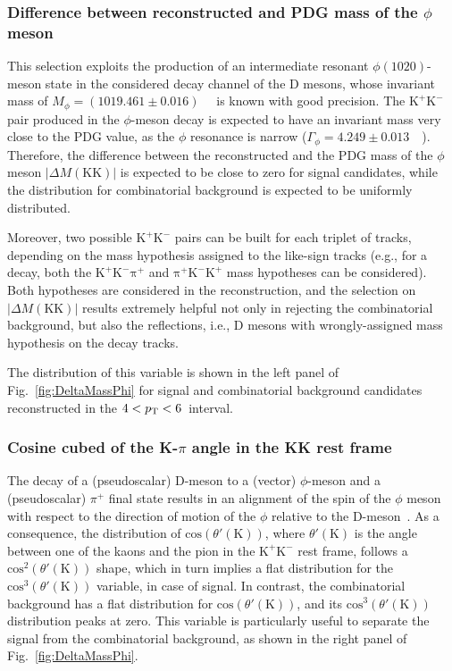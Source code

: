 \subsubsection{Difference between reconstructed and PDG mass of the \boldmath$\phi$ meson}
\begin{sloppypar}
This selection exploits the production of an intermediate resonant $\phi(1020)$-meson state in the considered decay channel of the D mesons, whose invariant mass of \mbox{$M_\phi = (1019.461\pm0.016)$}~\mevcc~\cite{pdg} is known with good precision. The $\mathrm{K^+K^-}$ pair produced in the $\phi$-meson decay is expected to have an invariant mass very close to the PDG value, as the $\phi$ resonance is narrow ($\Gamma_\phi = 4.249\pm0.013$~\mevcc~\cite{pdg}). Therefore, the difference between the reconstructed and the PDG mass of the $\phi$ meson $\lvert\Delta M(\mathrm{KK})\rvert$ is expected to be close to zero for signal candidates, while the distribution for combinatorial background is expected to be uniformly distributed.
\end{sloppypar}
Moreover, two possible $\mathrm{K^+K^-}$ pairs can be built for each triplet of tracks, depending on the mass hypothesis assigned to the like-sign tracks (e.g., for a \ds decay, both the $\mathrm{K^+K^-\pi^+}$ and $\mathrm{\pi^+K^-K^+}$ mass hypotheses can be considered). Both hypotheses are considered in the reconstruction, and the selection on $\lvert\Delta M(\mathrm{KK})\rvert$  results extremely helpful not only in rejecting the combinatorial background, but also the reflections, i.e., D mesons with wrongly-assigned mass hypothesis on the decay tracks.


The distribution of this variable is shown in the left panel of Fig.~\ref{fig:DeltaMassPhi} for signal and combinatorial background candidates reconstructed in the $4 < p_\mathrm{T} < 6$~\gevc interval.

\subsubsection{Cosine cubed of the K-\boldmath$\pi$ angle in the KK rest frame}
The decay of a (pseudoscalar) D-meson to a (vector) $\phi$-meson and a (pseudoscalar) $\pi^+$ final state results in an alignment of the spin of the $\phi$ meson with respect to the direction of motion of the $\phi$ relative to the D-meson~\cite{ZEUS:2000rhm}. As a consequence, the distribution of $\mathrm{cos}\left(\theta'(\mathrm K)\right)$, where $\theta'(\mathrm K)$ is the angle between one of the kaons and the pion in the $\mathrm{K^+K^-}$
rest frame, follows a $\mathrm{cos}^2\left(\theta'(\mathrm K)\right)$ shape, which in turn implies a flat distribution for the $\mathrm{cos}^3\left(\theta'(\mathrm K)\right)$ variable, in case of signal. In contrast, the combinatorial background has a flat distribution for $\mathrm{cos}\left(\theta'(\mathrm K)\right)$, and its $\mathrm{cos}^3\left(\theta'(\mathrm K)\right)$ distribution peaks at zero. This variable is particularly useful to separate the signal from the combinatorial background, as shown in the right panel of Fig.~\ref{fig:DeltaMassPhi}.


